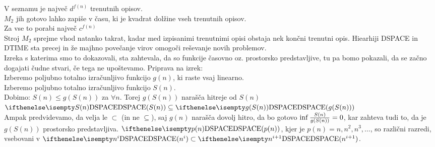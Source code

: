 \documentclass[10pt,a4paper,oneside]{book}
\begin{document}
\begin{neurejeno}
{{V seznamu je največ $d^{f(n)}$ trenutnih opisov.\\
$M_2$ jih gotovo lahko zapiše v času, ki je kvadrat dolžine vseh trenutnih opisov.\\%
Za vse to porabi največ $c^{f(n)}$\\
Stroj $M_2$ sprejme vhod natanko takrat, kadar med izpisanimi trenutnimi opisi obstaja nek končni trenutni opis.
}
}
Hiearhiji DSPACE in DTIME sta precej  in že majhno povečanje virov omogoči reševanje novih problemov.\\%
Izreka s katerima smo to dokazovali, sta zahtevala, da so funkcije časovno oz. prostorsko predstavljive, tu pa bomo pokazali, da se začno dogajati čudne stvari, če tega ne upoštevamo.
\br
Priprava na izrek:\\
Izberemo poljubno totalno izračunljivo funkcijo $g(n)$, ki raste vsaj linearno.\\
Izberemo poljubno totalno izračunljivo funkcijo $S(n)$.\\
Dobimo: $S(n) \leq g(S(n))$ za $\forall n$. Torej $g(S(n))$ narašča hitreje od $S(n)$\\
$\DSPACE{S(n)} \subseteq \DSPACE{g(S(n))}$\\
Ampak predvidevamo, da velja le $\subset$ (in ne $\subseteq$), saj $g(n)$ narašča dovolj hitro, da bo gotovo $\inf {S(n) \over g(S(n))} = 0$, kar zahteva tudi to, da je $g(S(n))$ prostorsko predstavljiva.
$\DSPACE{p(n)}$, kjer je $p(n)=n, n^2, n^3, \dots$, so različni razredi, vsebovani v $\DSPACE{n^i} \subset \DSPACE{n^{i+1}}$.\\

\end{neurejeno}
\end{document}
